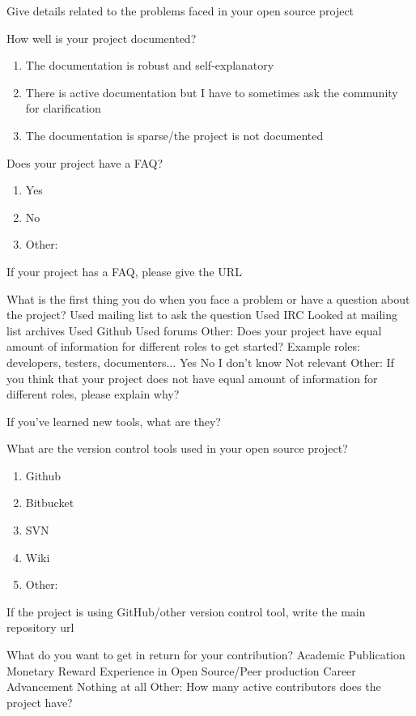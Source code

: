 \begin{table}
Give details related to the problems faced in your open source project

How well is your project documented?
\begin{enumerate}
\item The documentation is robust and self-explanatory
\item There is active documentation but I have to sometimes ask the community for clarification
\item The documentation is sparse/the project is not documented
\end{enumerate}

Does your project have a FAQ?
\begin{enumerate}
\item Yes
\item No
\item Other:
\end{enumerate}

If your project has a FAQ, please give the URL


What is the first thing you do when you face a problem or have a question about the project? Used mailing list to ask the question Used IRC Looked at mailing list archives Used Github Used forums Other: Does your project have equal amount of information for different roles to get started? Example roles: developers, testers, documenters... Yes No I don't know Not relevant Other: If you think that your project does not have equal amount of information for different roles, please explain why?

If you've learned new tools, what are they?

What are the version control tools used in your open source project?

\begin{enumerate}
\item Github
\item Bitbucket
\item SVN
\item Wiki
\item Other:
\end{enumerate}

If the project is using GitHub/other version control tool, write the main repository url

What do you want to get in return for your contribution? Academic Publication Monetary Reward Experience in Open Source/Peer production Career Advancement Nothing at all Other: How many active contributors does the project have?


\end{table}

